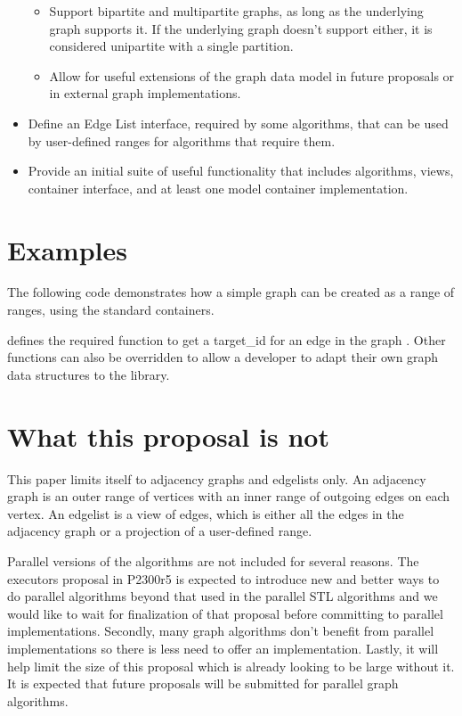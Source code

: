 \begin{itemize}
\begin{itemize}
\item Support bipartite and multipartite graphs, as long as the underlying graph supports it. If the underlying graph doesn't support either,
      it is considered unipartite with a single partition.
\item Allow for useful extensions of the graph data model in future proposals or in external graph implementations. 
\end{itemize}
\item Define an Edge List interface, required by some algorithms, that can be used by user-defined ranges for algorithms that require them.
\item Provide an initial suite of useful functionality that includes algorithms, views, container interface, and at least one 
model container implementation.
\end{itemize}

\section{Examples}


The following code demonstrates how a simple graph can be created as a range of ranges, using the standard containers. 

{\small
  
}

 defines the required function to get a target\_id for an edge in the graph . Other functions can also
be overridden to allow a developer to adapt their own graph data structures to the library.

\section{What this proposal is  \textbf{not}}

This paper limits itself to adjacency graphs and edgelists only. An adjacency graph is an outer range of vertices with an inner range of outgoing
edges on each vertex. An edgelist is a view of edges, which is either all the edges in the adjacency graph or a projection of a user-defined range.

Parallel versions of the algorithms are not included for several reasons. The executors proposal in P2300r5 \cite{REF_P2300r5} is expected to introduce new 
and better ways to do parallel algorithms beyond that used in the parallel STL algorithms and we would like to wait for finalization of that proposal before 
committing to parallel implementations. Secondly, many graph algorithms don't benefit from parallel implementations so there is less need to offer an implementation. 
Lastly, it will help limit the size of this proposal which is already looking to be large without it. It is expected that future proposals will be submitted for parallel graph algorithms. 

